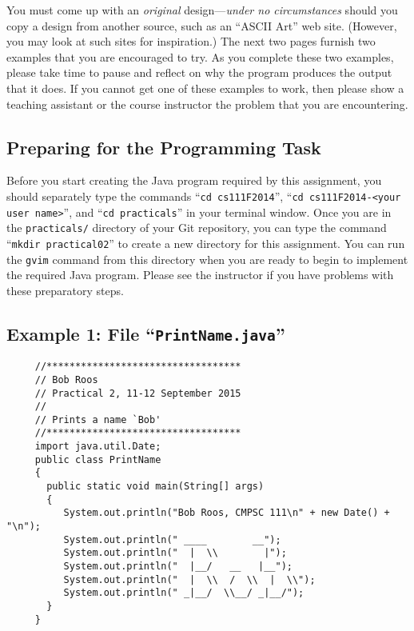 You must come up with an {\em original} design---{\em under no circumstances} should you copy a design from another
source, such as an ``ASCII Art'' web site. (However, you may look at such sites for inspiration.) The next two pages
furnish two examples that you are encouraged to try. As you complete these two examples, please take time to pause and
reflect on why the program produces the output that it does.  If you cannot get one of these examples to work, then
please show a teaching assistant or the course instructor the problem that you are encountering.

\subsection*{Preparing for the Programming Task}

Before you start creating the Java program required by this assignment, you should separately type the commands ``{\tt cd
  cs111F2014}'', ``{\tt cd cs111F2014-<your user name>}'', and ``{\tt cd practicals}'' in your terminal window. Once you
are in the {\tt practicals/} directory of your Git repository, you can type the command ``{\tt mkdir practical02}'' to
create a new directory for this assignment. You can run the {\tt gvim} command from this directory when you are ready to
begin to implement the required Java program. Please see the instructor if you have problems with these preparatory steps.


\subsection*{Example 1: File ``{\tt PrintName.java}''}
\begin{verbatim}
     //**********************************
     // Bob Roos
     // Practical 2, 11-12 September 2015
     //
     // Prints a name `Bob'
     //**********************************
     import java.util.Date;
     public class PrintName
     {
       public static void main(String[] args)
       {
          System.out.println("Bob Roos, CMPSC 111\n" + new Date() + "\n");
          System.out.println(" ____        __");
          System.out.println("  |  \\        |");
          System.out.println("  |__/   __   |__");
          System.out.println("  |  \\  /  \\  |  \\");
          System.out.println(" _|__/  \\__/ _|__/");
       }
     }
\end{verbatim}

